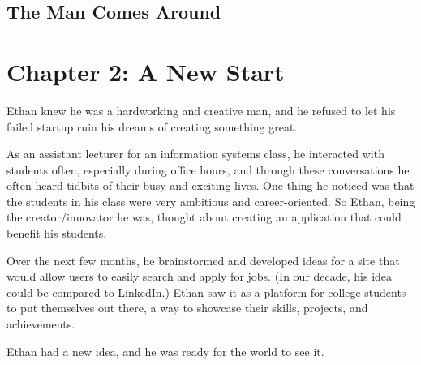 \documentclass[a4paper,12pt,twoside]{book}
\begin{document}
\section{The Man Comes Around}

\chapter{Chapter 2: A New Start}

Ethan knew he was a hardworking and creative man, and he refused to let his failed startup ruin his dreams of creating something great. 

As an assistant lecturer for an information systems class, he interacted with students often, especially during office hours, and through these conversations he often heard tidbits of their busy and exciting lives. One thing he noticed was that the students in his class were very ambitious and career-oriented. So Ethan, being the creator/innovator he was, thought about creating an application that could benefit his students. 

Over the next few months, he brainstormed and developed ideas for a site that would allow users to easily search and apply for jobs. (In our decade, his idea could be compared to LinkedIn.) Ethan saw it as a platform for college students to put themselves out there, a way to showcase their skills, projects, and achievements. 

Ethan had a new idea, and he was ready for the world to see it. 
 
\end{document}
